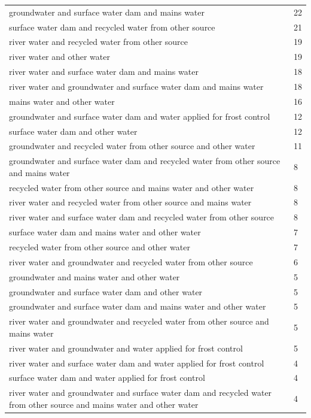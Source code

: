 \documentclass[review,12pt,authoryear]{elsarticle}
\begin{document}
\begin{linenumbers}
\begin{table}[]
\begin{tabular}{@{}ll@{}}
  groundwater and surface water dam and mains water & 22 \\
  surface water dam and recycled water from other source & 21 \\
  river water and recycled water from other source & 19 \\
  river water and other water & 19 \\
  river water and surface water dam and mains water & 18 \\
  river water and groundwater and surface water dam and mains water & 18 \\
  mains water and other water & 16 \\
  groundwater and surface water dam and water applied for frost control & 12 \\
  surface water dam and other water & 12 \\
  groundwater and recycled water from other source and other water & 11 \\
  groundwater and surface water dam and recycled water from other source and mains water & 8 \\
  recycled water from other source and mains water and other water & 8 \\
  river water and recycled water from other source and mains water & 8 \\
  river water and surface water dam and recycled water from other source & 8 \\
  surface water dam and mains water and other water & 7 \\
  recycled water from other source and other water & 7 \\
  river water and groundwater and recycled water from other source & 6 \\
  groundwater and mains water and other water & 5 \\
  groundwater and surface water dam and other water & 5 \\
  groundwater and surface water dam and mains water and other water & 5 \\
  river water and groundwater and recycled water from other source and mains water & 5 \\
  river water and groundwater and water applied for frost control & 5 \\
  river water and surface water dam and water applied for frost control & 4 \\
  surface water dam and water applied for frost control & 4 \\
  river water and groundwater and surface water dam and recycled water from other source and mains water and other water & 4 \\

\end{tabular}
\end{table}
\end{linenumbers}
\end{document}
